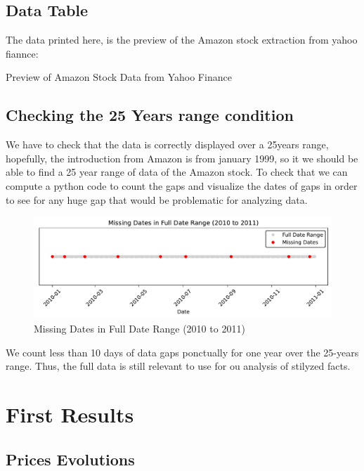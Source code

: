\documentclass{article}
\begin{document}
\subsection{Data Table}
The data printed here, is the preview of the Amazon stock extraction from yahoo fiannce:
\begin{table}[h!]
    \centering
      
    \caption{Preview of Amazon Stock Data from Yahoo Finance}
    \label{tab:amazon_stock_preview}
\end{table}



\subsection{Checking the 25 Years range condition}

We have to check that the data is correctly displayed over a 25years range, hopefully, 
the introduction from Amazon is from january 1999, so it we should be able to find a 25 year range
of data of the Amazon stock. To check that we can compute a python code to count the gaps and visualize 
the dates of gaps in order to see for any huge gap that would be problematic for analyzing data.

\begin{figure}[H]
    \centering
    \includegraphics[width=\textwidth]{Img/MissingDates(2010_to_2011).pdf}
    \caption{Missing Dates in Full Date Range (2010 to 2011)}
    \label{fig:missing_dates}
\end{figure}

\noindent We count less than 10 days of data gaps ponctually for one year over the 25-years range. Thus, the full data is still relevant to use for ou analysis of stilyzed facts.

\section{First Results}

\subsection{Prices Evolutions}
\end{document}
